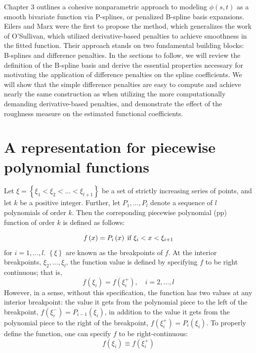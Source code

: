 \documentclass[12pt]{article}
\theoremstyle{definition}
\begin{document}
\nocite{*}

Chapter 3 outlines a cohesive nonparametric approach to modeling $\phi\left(s,t\right)$ as a smooth bivariate function via P-splines, or penalized B-spline basis expansions. Eilers and Marx were the first to propose the method, which generalizes the work of O'Sullivan, which utilized derivative-based penalties to achieve smoothness in the fitted function. Their approach stands on two fundamental building blocks: B-splines and difference penalties. In the sections to follow, we will review the definition of the B-spline basis and derive the essential properties necessary for motivating the application of difference penalties on the spline coefficients. We will show that the simple difference penalties are easy to compute and achieve nearly the same construction as when utilizing the more computationally demanding derivative-based penalties, and demonstrate the effect of the roughness measure on the estimated functional coefficients.  


\section{A representation for piecewise polynomial functions}

Let $\xi = \left\{ \xi_1<\xi_2<\dots<\xi_{l+1} \right\}$ be a set of strictly increasing series of points, and let $k$ be a positive integer. Further, let $P_1,\dots,P_l$ denote a sequence of $l$ polynomials of order $k$. Then the correponding piecewise polynomial (pp) function of order $k$ is defined as follows:

\[
f\left(x\right) = P_i\left(x\right) \; \textup{if } \xi_i < x < \xi_{i+1}
\] 
\noindent
for $i=1,\dots,l$. $\left\{\xi\right\}$ are known as the breakpoints of $f$. At the interior breakpoints, $\xi_2,\dots, \xi_l$, the function value is defined by specifying $f$ to be right continuous; that is, 
\[
f\left(\xi_i\right) = f\left(\xi_i^+\right),\quad i=2,\dots,l
\]
However, in a sense, without this specification, the function has two values at any interior breakpoint: the value it gets from the polynomial piece to the left of the breakpoint, $f\left(\xi_i^-\right) = P_{i-1}\left(\xi_i\right)$, in addition to the value it gets from the polynomial piece to the right of the breakpoint, $f\left(\xi_i^+\right) = P_{i}\left(\xi_i\right)$. To properly define the function, one can specify $f$ to be right-continuous:
\begin{equation}
f\left(\xi_i\right) \equiv f\left(\xi_i^+\right) 
\end{equation}
\end{document}
